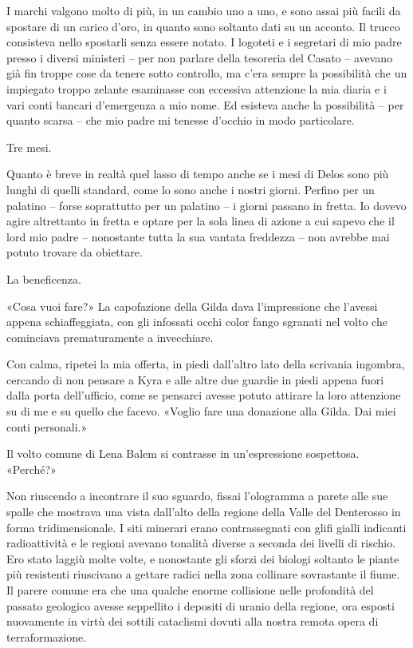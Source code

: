 I marchi valgono molto di più, in un cambio uno a uno, e sono assai più
facili da spostare di un carico d'oro, in quanto sono soltanto dati su
un acconto. Il trucco consisteva nello spostarli senza essere notato. I
logoteti e i segretari di mio padre presso i diversi ministeri -- per
non parlare della tesoreria del Casato -- avevano già fin troppe cose da
tenere sotto controllo, ma c'era sempre la possibilità che un impiegato
troppo zelante esaminasse con eccessiva attenzione la mia diaria e i
vari conti bancari d'emergenza a mio nome. Ed esisteva anche la
possibilità -- per quanto scarsa -- che mio padre mi tenesse d'occhio in
modo particolare.

Tre mesi.

Quanto è breve in realtà quel lasso di tempo anche se i mesi di Delos
sono più lunghi di quelli standard, come lo sono anche i nostri giorni.
Perfino per un palatino -- forse soprattutto per un palatino -- i giorni
passano in fretta. Io dovevo agire altrettanto in fretta e optare per la
sola linea di azione a cui sapevo che il lord mio padre -- nonostante
tutta la sua vantata freddezza -- non avrebbe mai potuto trovare da
obiettare.

La beneficenza.

\begin{figure}
	\centering
	\def\svgwidth{\columnwidth}
	\scalebox{0.2}{}
\end{figure}

«Cosa vuoi fare?» La capofazione della Gilda dava l'impressione che
l'avessi appena schiaffeggiata, con gli infossati occhi color fango
sgranati nel volto che cominciava prematuramente a invecchiare.

Con calma, ripetei la mia offerta, in piedi dall'altro lato della
scrivania ingombra, cercando di non pensare a Kyra e alle altre due
guardie in piedi appena fuori dalla porta dell'ufficio, come se pensarci
avesse potuto attirare la loro attenzione su di me e su quello che
facevo. «Voglio fare una donazione alla Gilda. Dai miei conti
personali.»

Il volto comune di Lena Balem si contrasse in un'espressione sospettosa.
«Perché?»

Non riuscendo a incontrare il suo sguardo, fissai l'ologramma a parete
alle sue spalle che mostrava una vista dall'alto della regione della
Valle del Denterosso in forma tridimensionale. I siti minerari erano
contrassegnati con glifi gialli indicanti radioattività e le regioni
avevano tonalità diverse a seconda dei livelli di rischio. Ero stato
laggiù molte volte, e nonostante gli sforzi dei biologi soltanto le
piante più resistenti riuscivano a gettare radici nella zona collinare
sovrastante il fiume. Il parere comune era che una qualche enorme
collisione nelle profondità del passato geologico avesse seppellito i
depositi di uranio della regione, ora esposti nuovamente in virtù dei
sottili cataclismi dovuti alla nostra remota opera di terraformazione.

